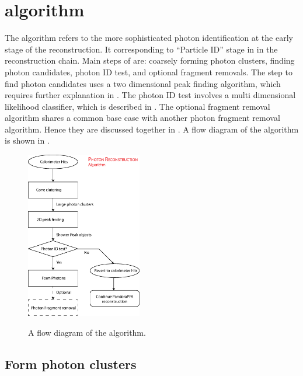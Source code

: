 \section{\PhotonReconstruction algorithm}
\label{sec:photonRecostrcution}

The \PhotonReconstruction algorithm refers to the more sophisticated photon identification at the early stage of the reconstruction. It corresponding to ``Particle ID'' stage in  in the \pandora reconstruction chain.  Main steps of \PhotonReconstruction are: coarsely forming photon clusters, finding photon candidates, photon ID test, and optional fragment removals. The step to find photon candidates uses   a   two dimensional peak finding algorithm, which requires further explanation in . The photon ID test involves a multi dimensional likelihood classifier, which is described in . The optional fragment removal algorithm shares a common base case with another photon fragment removal algorithm. Hence they are discussed together in  . A flow diagram of the \PhotonReconstruction algorithm is shown in .

\begin{figure}[tbph]
\centering
{\includegraphics[width=0.45\textwidth]{photon/photonRecoFlow}}
\caption[A flow diagram of the \PhotonReconstruction algorithm.]
{A flow diagram of the \PhotonReconstruction algorithm.}
\label{fig:photonPhotonRecoFlow}
\end{figure}


\subsection{Form photon clusters}

